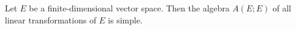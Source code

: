 Let $E$ be a finite-dimensional vector space. Then the algebra $A(E; E)$ of all linear transformations of $E$ is simple.
